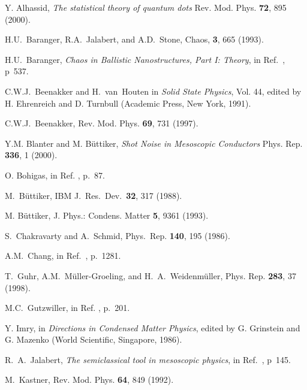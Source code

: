 \documentclass[a4paper,10pt]{article}
\begin{document}
\renewcommand{\refname}{Recommended reading (mainly review articles)}
\begin{thebibliography}{Cucc~02b}

Y. Alhassid, {\it The statistical theory of quantum dots}
Rev. Mod. Phys. {\bf 72}, 895 (2000).

H.U.~Baranger, R.A.~Jalabert, and A.D.~Stone,
Chaos, {\bf 3}, 665 (1993).

H.U.~Baranger,
{\it Chaos in Ballistic Nanostructures, Part I: Theory}, 
in Ref.~\cite{timp95}, p~537.

C.W.J.~Beenakker and H.~van~Houten in
{\it Solid State Physics}, Vol. 44, edited by H. Ehrenreich and D.
Turnbull (Academic Press, New York, 1991). 

C.W.J.~Beenakker, Rev. Mod. Phys. {\bf 69}, 731 (1997).

Y.M. Blanter and M. B\"uttiker,
{\it Shot Noise in Mesoscopic Conductors}
Phys. Rep. {\bf 336}, 1 (2000).

O. Bohigas, in Ref. \cite{LesHou89}, p.~87.

M.\ B\"uttiker, IBM J.\ Res.\ Dev.\ \textbf{32}, 317 (1988).

M. B\"uttiker, 
J. Phys.: Condens. Matter {\bf 5}, 9361 (1993).

S.~Chakravarty and A.~Schmid, Phys.~Rep. {\bf 140}, 195 (1986).

 A.M.~Chang,
in Ref.~\cite{csf}, p.~1281.

T.~Guhr, A.M.~M\"uller-Groeling, and H.~A.~Weidenm\"uller,
Phys. Rep. {\bf 283}, 37 (1998).

M.C.~Gutzwiller, in Ref. \cite{LesHou89}, p.~201.

Y. Imry, in {\it Directions in Condensed Matter Physics}, edited by G. Grinstein and G. Mazenko 
(World Scientific, Singapore, 1986).

R.\ A.\ Jalabert, 
{\it The semiclassical tool in mesoscopic physics}, 
in Ref.~\cite{Fer00}, p~145. 

M.~Kastner, Rev. Mod. Phys. {\bf 64}, 849 (1992).


\end{thebibliography}
\end{document}

